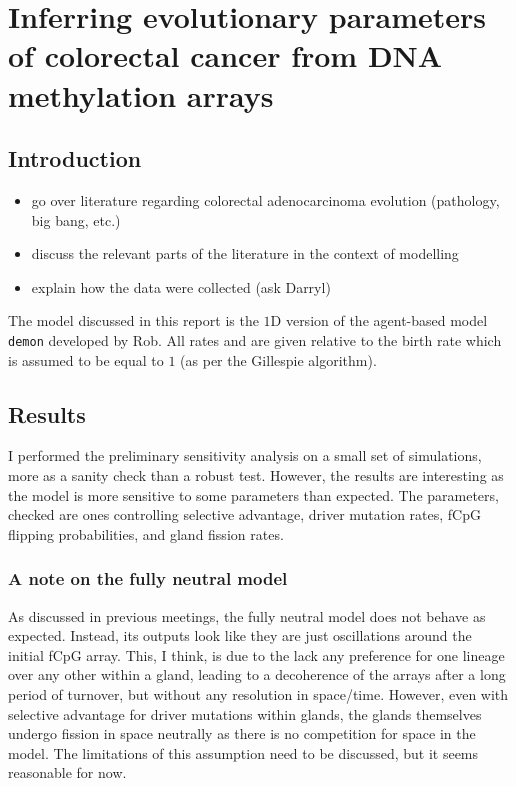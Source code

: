 \chapter{Inferring evolutionary parameters of colorectal cancer from DNA methylation arrays}\label{methchap}
\section{Introduction}
\begin{itemize}
    \item go over literature regarding colorectal adenocarcinoma evolution (pathology, big bang, etc.)
    \item discuss the relevant parts of the literature in the context of modelling
    \item explain how the data were collected (ask Darryl)
\end{itemize}
The model discussed in this report is the $1$D version of the agent-based model \texttt{demon} developed by Rob. All rates and are given relative to the birth rate which is assumed to be equal to $1$ (as per the Gillespie algorithm).
\section{Results}
I performed the preliminary sensitivity analysis on a small set of simulations, more as a sanity check than a robust test. However, the results are interesting as the model is more sensitive to some parameters than expected. The parameters, checked are ones controlling selective advantage, driver mutation rates, fCpG flipping probabilities, and gland fission rates.
\subsection{A note on the fully neutral model}
As discussed in previous meetings, the fully neutral model does not behave as expected. Instead, its outputs look like they are just oscillations around the initial fCpG array. This, I think, is due to the lack any preference for one lineage over any other within a gland, leading to a decoherence of the arrays after a long period of turnover, but without any resolution in space/time. However, even with selective advantage for driver mutations within glands, the glands themselves undergo fission in space neutrally as there is no competition for space in the model. The limitations of this assumption need to be discussed, but it seems reasonable for now.

